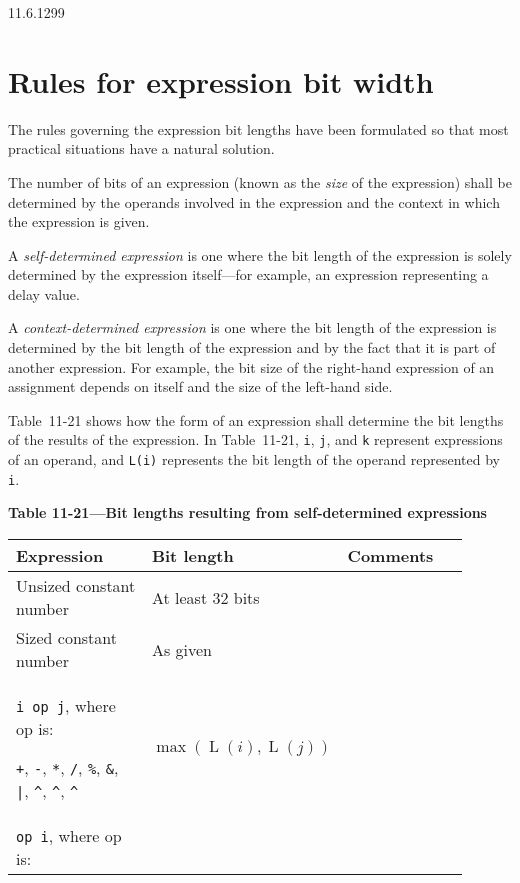\documentclass{article}
\DeclareMathOperator{\Size}{L}
\newcommand{\tild}{\raisebox{-.7ex}{\textasciitilde{}}}
\newcommand{\binOp}{\texttt{+}, \texttt{-}, \texttt{*}, \texttt{/}, \texttt{\%},
\texttt{\&}, \texttt{|}, \texttt{\^{}}, \texttt{\^{}\tild},
\texttt{\tild\^{}}}
\begin{document}
\begin{lrmquote}{11.6.1}{299}
  \section{Rules for expression bit width}
  \label{expression-bit-widths}

  {
    \color{red}

    The rules governing the expression bit lengths have been formulated so that most
    practical situations have a natural solution.

    The number of bits of an expression (known as the \emph{size} of the
    expression) shall be determined by the operands involved in the expression and
    the context in which the expression is given.

    A \emph{self-determined expression} is one where the bit length of the expression is
    solely determined by the expression itself—for example, an expression
    representing a delay value.

    A \emph{context-determined expression} is one where the bit length of the expression is
    determined by the bit length of the expression and by the fact that it is part
    of another expression. For example, the bit size of the right-hand expression of
    an assignment depends on itself and the size of the left-hand side.

    Table~11-21 shows how the form of an expression shall determine the bit lengths
    of the results of the expression. In Table~11-21, \texttt{i}, \texttt{j}, and
    \texttt{k} represent expressions of an operand, and \texttt{L(i)} represents the
    bit length of the operand represented by \texttt{i}.

    \begin{center}
      \textbf{Table 11-21---Bit lengths resulting from self-determined expressions}
      \begin{longtable}{|p{0.35\linewidth}|C{0.25\linewidth}|C{0.3\linewidth}|}
        \hline
        \centering \textbf{Expression}
         & \textbf{Bit length}
         & \textbf{Comments}
        \\
        \hline
        Unsized constant number
         & At least 32 bits
         &
        \\
        \hline
        Sized constant number
         & As given
         &
        \\
        \hline
        \verb|i op j|, where op is:

        \binOp{}
         & $\max\left(\Size(i), \Size(j)\right)$
         &
        \\
        \hline
        \verb|op i|, where op is:


\end{longtable}
\end{center}}
\end{lrmquote}
\end{document}
